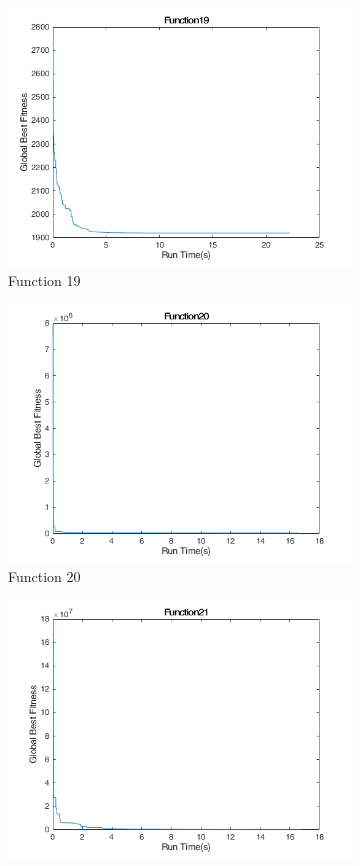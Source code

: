 \begin{figure}
\begin{subfigure}[b]{0.4\textwidth}
    \includegraphics[width=\textwidth]{img/cecrt/f19}
    \caption{Function 19}
  \end{subfigure}
  \begin{subfigure}[b]{0.4\textwidth}
    \includegraphics[width=\textwidth]{img/cecrt/f20}
    \caption{Function 20}
  \end{subfigure}
  \begin{subfigure}[b]{0.4\textwidth}
    \includegraphics[width=\textwidth]{img/cecrt/f21}

\end{subfigure}
\end{figure}
